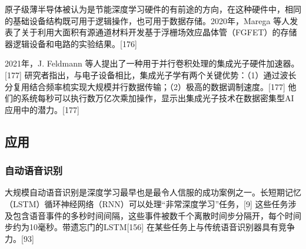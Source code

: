 原子级薄半导体被认为是节能深度学习硬件的有前途的方向，在这种硬件中，相同的基础设备结构既可用于逻辑操作，也可用于数据存储。2020年，Marega 等人发表了关于利用大面积有源通道材料开发基于浮栅场效应晶体管（FGFET）的存储器逻辑设备和电路的实验结果。[176]

2021年，J. Feldmann 等人提出了一种用于并行卷积处理的集成光子硬件加速器。[177] 研究者指出，与电子设备相比，集成光子学有两个关键优势：（1）通过波长分复用结合频率梳实现大规模并行数据传输；（2）极高的数据调制速度。[177] 他们的系统每秒可以执行数万亿次乘加操作，显示出集成光子技术在数据密集型AI应用中的潜力。[177]
\subsection{应用}
\subsubsection{自动语音识别}  
大规模自动语音识别是深度学习最早也是最令人信服的成功案例之一。长短期记忆（LSTM）循环神经网络（RNN）可以处理“非常深度学习”任务，[9] 这些任务涉及包含语音事件的多秒时间间隔，这些事件被数千个离散时间步分隔开，每个时间步约为10毫秒。带遗忘门的LSTM[156] 在某些任务上与传统语音识别器具有竞争力。[93]  


